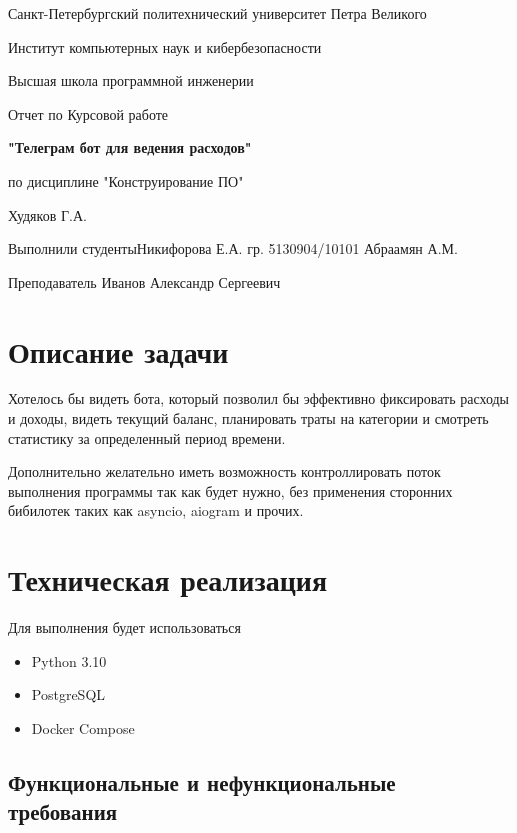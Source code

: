 \documentclass[12pt]{extarticle}
\begin{document}
\thispagestyle{empty}
\begin{center}
    Санкт-Петербургский политехнический университет Петра Великого\par
    Институт компьютерных наук и кибербезопасности\par
    Высшая школа программной инженерии
\end{center}
\hspace{0pt}
\vfill
\begin{center}
    {\huge Отчет по Курсовой работе\par}
    {\Large \bfseries{"Телеграм бот для ведения расходов"}\par}
    по дисциплине "Конструирование ПО"\par
    \vfill
\end{center}
{\raggedleft Худяков Г.А.\par}
\noindent Выполнили студенты\hfill Никифорова Е.А.\newline
гр. 5130904/10101 \hfill Абраамян А.М.\par
\hfill \break
\hfill \break
\hfill \break
Преподаватель \hfill Иванов Александр Сергеевич

\pagebreak

\renewcommand*\contentsname{Содержание}
\tableofcontents

\pagebreak
\section{Описание задачи}
Хотелось бы видеть бота, который позволил бы эффективно фиксировать расходы и доходы, видеть текущий баланс, планировать траты на категории и смотреть статистику за определенный период времени.

Дополнительно желательно иметь возможность контроллировать поток выполнения программы так как будет нужно, без применения сторонних бибилотек таких как asyncio, aiogram и прочих.

\pagebreak

\section{Техническая реализация}
Для выполнения будет использоваться
\begin{itemize}
    \item Python 3.10
    \item PostgreSQL
    \item Docker Compose
\end{itemize}
\subsection{Функциональные и нефункциональные требования}
\end{document}
